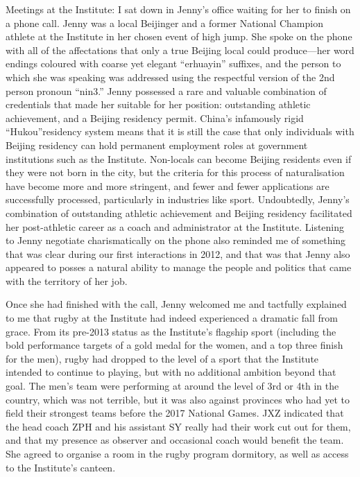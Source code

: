 Meetings at the Institute:
I sat down in Jenny's office waiting for her to finish on a phone call. Jenny was a local Beijinger and a former National Champion athlete at the Institute in her chosen event of high jump. She spoke on the phone with all of the affectations that only a true Beijing local could produce---her word endings coloured with coarse yet elegant ``erhuayin'' suffixes, and the person to which she was speaking was addressed using the respectful version of the 2nd person pronoun ``nin3.''  Jenny possessed a rare and valuable combination of credentials that made her suitable for her position:  outstanding athletic achievement, and a Beijing residency permit.  China's infamously rigid ``Hukou''residency system means that it is still the case that only individuals with Beijing residency can hold permanent employment roles at government institutions such as the Institute.  Non-locals can become Beijing residents even if they were not born in the city, but the criteria for this process of naturalisation have become more and more stringent, and fewer and fewer applications are successfully processed, particularly in industries like sport.  Undoubtedly, Jenny's combination of outstanding athletic achievement and Beijing residency facilitated her post-athletic career as a coach and administrator at the Institute.  Listening to Jenny negotiate charismatically on the phone also reminded me of something that was clear during our first interactions in 2012, and that was that Jenny also appeared to posses a natural ability to manage the people and politics that came with the territory of her job.

Once she had finished with the call, Jenny welcomed me and tactfully explained to me that rugby at the Institute had indeed experienced a dramatic fall from grace. From its pre-2013 status as the Institute's flagship sport (including the bold performance targets of a gold medal for the women, and a top three finish for the men), rugby had dropped to the level of a sport that the Institute intended to continue to playing, but with no additional ambition beyond that goal. The men's team were performing at around the level of 3rd or 4th in the country, which was not terrible, but it was also against provinces who had yet to field their strongest teams before the 2017 National Games.  JXZ indicated that the head coach ZPH and his assistant SY really had their work cut out for them, and that my presence as observer and occasional coach would benefit the team.  She agreed to organise a room in the rugby program dormitory, as well as access to the Institute's canteen.


